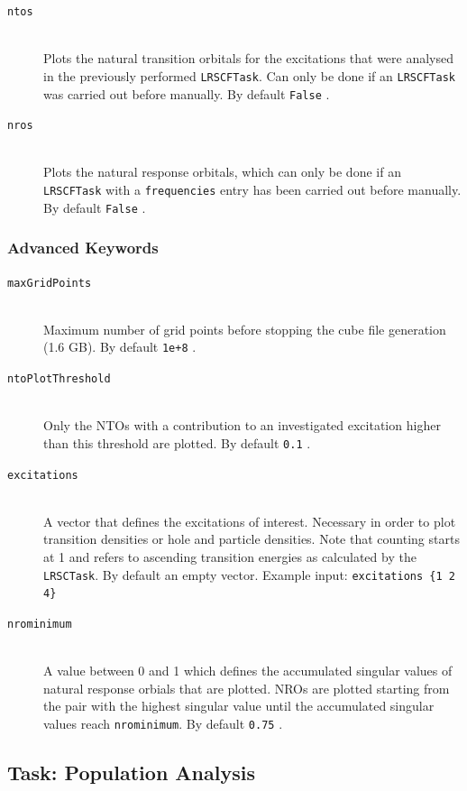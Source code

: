 \documentclass[bibliography=totocnumbered,a4paper,10pt,oneside]{scrbook}
\newcommand{\ttt}[1]{%
  \begingroup\setlength{\fboxsep}{1pt}%
  \colorbox{serenity-green!30}{\texttt{\hspace*{2pt}\vphantom{(g}#1\hspace*{2pt}}}%
  \endgroup
}
\begin{document}
\begin{description}
    \item [\texttt{ntos}]\hfill \\
    Plots the natural transition orbitals for the excitations that were analysed in the previously performed \texttt{LRSCFTask}. Can only be done if an \texttt{LRSCFTask} was carried out before manually. By default \ttt{False}.
    \item [\texttt{nros}]\hfill \\
    Plots the natural response orbitals, which can only be done if an \texttt{LRSCFTask} with a \texttt{frequencies} entry has been carried out before manually. By default \ttt{False}.
\end{description}

\subsubsection{Advanced Keywords}
\begin{description}
    \item [\texttt{maxGridPoints}]\hfill \\
Maximum number of grid points before stopping the cube file generation (1.6 GB). By default \ttt{1e+8}.
    \item [\texttt{ntoPlotThreshold}]\hfill \\
    Only the NTOs with a contribution to an investigated excitation higher than this threshold are plotted. By default \ttt{0.1}.
\item [\texttt{excitations}]\hfill \\
A vector that defines the excitations of interest. Necessary in order to plot transition densities or hole and particle densities. Note that counting starts at 1 and refers to ascending transition energies as calculated by the \texttt{LRSCTask}. By default an empty vector. Example input: \ttt{excitations \{1 2 4\}}
\item [\texttt{nrominimum}]\hfill \\
A value between 0 and 1 which defines the accumulated singular values of natural response orbials that are plotted. NROs are plotted starting from the pair with the highest singular value until the accumulated singular values reach \texttt{nrominimum}. By default \ttt{0.75}.
\end{description}


\subsection{Task: Population Analysis}
\end{document}
